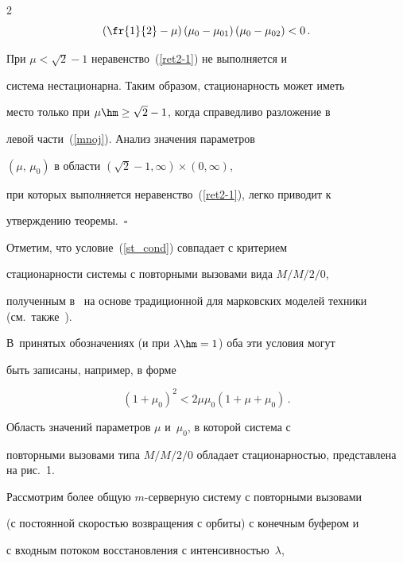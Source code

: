 \begin{multicols}{2}
\begin{equation}
\left(\fr{1}{2}-\mu\right)\left(\mu_0-\mu_{01}\right)\left(\mu_0-\mu_{02}\right)<0\,. 


\end{equation}


При $\mu < \sqrt{2}-1$ неравенство~(\ref{ret2-1}) не выполняется и


сис\-те\-ма нестационарна. Таким образом, стационарность может иметь


место только при $\mu\hm\ge \sqrt{2}-1$, когда справедливо разложение в


левой части~(\ref{mnoj}). Анализ значения  параметров


$(\mu,\,\mu_0)$ в области $ (\sqrt{2}-1, \infty)\times (0, \infty)$,


при которых выполняется неравенство~(\ref{ret2-1}), легко приводит к


утверждению  теоремы.\hfill~$\square$





Отметим, что  условие~(\ref{st_cond}) совпадает с критерием


стационарности   системы с повторными вызовами вида $M/M/2/0$,


полученным в~\cite{A96} на основе традиционной для марковских моделей техники   (см.\ также~\cite {AGN01}).


 В~принятых обозначениях  (и  при $\lambda\hm=1$) оба эти условия могут


быть записаны, например,  в форме


\begin{equation*}


\left(1+\mu_0\right)^2<2 \mu \mu_0\left(1+\mu+\mu_0\right)\,.


\end{equation*}





Область значений параметров $\mu$ и~$\mu_0$,  в которой сис\-те\-ма с


повторными вызовами типа  $M/M/2/0$ обладает стационарностью, представлена на рис.~1.








Рассмотрим  более общую  $m$-сер\-вер\-ную сис\-те\-му с повторными вызовами


(с постоянной ско\-ростью возвращения с орбиты) с конечным буфером  и


с входным потоком восстановления с интенсив\-ностью~$\lambda$,



\end{multicols}
